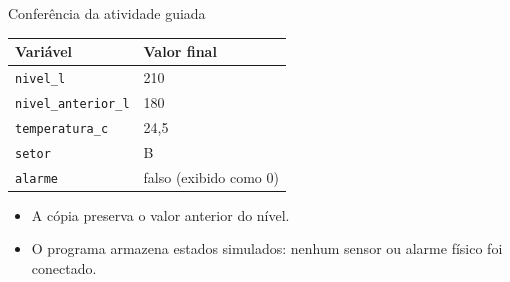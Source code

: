 \begin{frame}{Conferência da atividade guiada}
\begin{center}
\begin{tabular}{ll}
\toprule
Variável & Valor final \\
\midrule
\texttt{nivel\_l} & 210 \\
\texttt{nivel\_anterior\_l} & 180 \\
\texttt{temperatura\_c} & 24,5 \\
\texttt{setor} & B \\
\texttt{alarme} & falso (exibido como 0) \\
\bottomrule
\end{tabular}
\end{center}
\begin{itemize}
\item A cópia preserva o valor anterior do nível.
\item O programa armazena estados simulados: nenhum sensor ou alarme físico foi conectado.
\end{itemize}
\end{frame}
